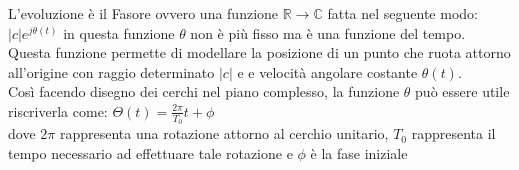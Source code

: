     \noindent
    L'evoluzione è il Fasore ovvero una funzione $\mathbb{R}\rightarrow\mathbb{C}$ fatta nel seguente modo:\\$|c|e^{j\theta(t)}$ in questa funzione $\theta$ non è più fisso ma è una funzione del tempo.\\
    Questa funzione permette di modellare la posizione di un punto
    che ruota attorno all’origine con raggio determinato $|c|$ e e velocità angolare costante $\theta(t)$.\\
    
    \noindent
    Così facendo disegno dei cerchi nel piano complesso, la funzione $\theta$ può essere utile riscriverla come:
    $\Theta(t)=\frac{2\pi}{T_0}t+\phi$ \\dove $2\pi$ rappresenta una rotazione attorno al cerchio unitario, $T_0$ rappresenta il tempo necessario ad effettuare tale rotazione e $\phi$ è la fase iniziale
    
